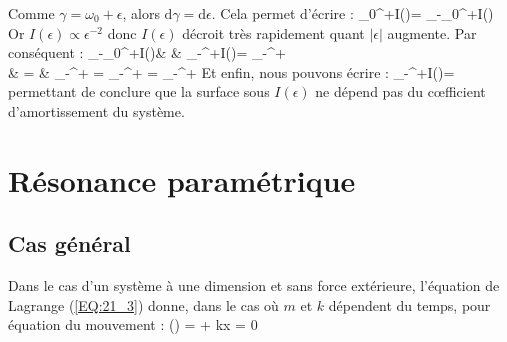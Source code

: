 Comme $\gamma = \omega_{0} + \epsilon$, alors $\mathrm{d}\gamma = \mathrm{d}\epsilon$. Cela permet d'\'{e}crire :
\benn
	\int_{0}^{+\infty}I(\gamma)\gamma = \int_{-\omega_{0}}^{+\infty}I(\epsilon)\epsilon
\eenn
Or $I(\epsilon) \propto \epsilon^{-2}$ donc $I(\epsilon)$ d\'{e}croit tr\`{e}s rapidement quant $\lvert\epsilon\rvert$ augmente. Par cons\'{e}quent :
\bea
	\int_{-\omega_{0}}^{+\infty}I(\epsilon)\epsilon & \approx & \int_{-\infty}^{+\infty}I(\epsilon)\epsilon = \int_{-\infty}^{+\infty} \nonumber \\
	& = & \int_{-\infty}^{+\infty} = \int_{-\infty}^{+\infty} = \left[\arctan\right]_{-\infty}^{+\infty} \nonumber
\eea
Et enfin, nous pouvons \'{e}crire :
\be
	\int_{-\infty}^{+\infty}I(\epsilon)\epsilon =  \label{EQ:26_10}
\ee
permettant de conclure que la surface sous $I(\epsilon)$ ne d\'{e}pend pas du c{\oe}fficient d'amortissement du syst\`{e}me.

\section{R\'{e}sonance param\'{e}trique}\label{PAR:27}

\subsection{Cas g\'{e}n\'{e}ral}

Dans le cas d'un syst\`{e}me \`{a} une dimension et sans force ext\'{e}rieure, l'\'{e}quation de Lagrange (\ref{EQ:21_3}) donne, dans le cas o\`{u} $m$ et $k$ d\'{e}pendent du temps, pour \'{e}quation du mouvement :
\be
	\left(\right) =  \Leftrightarrow {} + kx = 0 \label{EQ:27_1}
\ee


